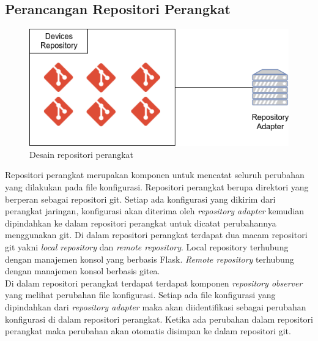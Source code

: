 		\subsection{Perancangan Repositori Perangkat}
		\begin{figure}[H]
			\centering
			\includegraphics[width=\textwidth]{Images/C-3/devices-repository.png}
			\caption{Desain repositori perangkat}
			\label{DesainRepositoriPerangkat}
		\end{figure}
			Repositori perangkat merupakan komponen untuk mencatat seluruh perubahan yang dilakukan pada file konfigurasi. Repositori perangkat berupa direktori yang berperan sebagai repositori git. Setiap ada konfigurasi yang dikirim dari perangkat jaringan, konfigurasi akan diterima oleh \textit{repository adapter} kemudian dipindahkan ke dalam repositori perangkat untuk dicatat perubahannya menggunakan git. Di dalam repositori perangkat terdapat dua macam repositori git yakni \textit{local repository} dan \textit{remote repository}. Local repository terhubung dengan manajemen konsol yang berbasis Flask. \textit{Remote repository} terhubung dengan manajemen konsol berbasis gitea. \\
			\indent Di dalam repositori perangkat terdapat terdapat komponen \textit{repository observer} yang melihat perubahan file konfigurasi. Setiap ada file konfigurasi yang dipindahkan dari \textit{repository adapter} maka akan diidentifikasi sebagai perubahan konfigurasi di dalam repositori perangkat. Ketika ada perubahan dalam repositori perangkat maka perubahan akan otomatis disimpan ke dalam repositori git.

		
            
